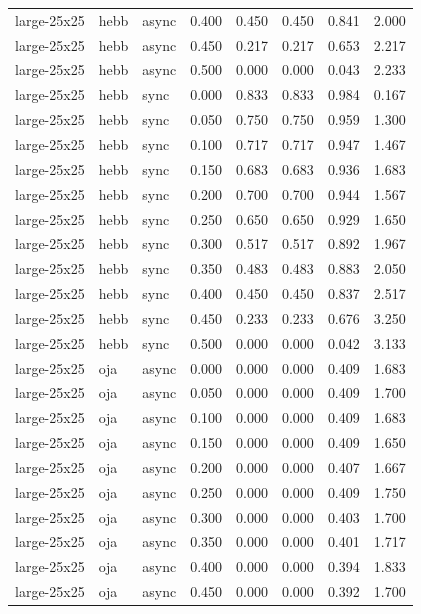 \begin{tabular}{lllrrrrr}
large-25x25 & hebb & async & 0.400 & 0.450 & 0.450 & 0.841 & 2.000 \\
large-25x25 & hebb & async & 0.450 & 0.217 & 0.217 & 0.653 & 2.217 \\
large-25x25 & hebb & async & 0.500 & 0.000 & 0.000 & 0.043 & 2.233 \\
large-25x25 & hebb & sync & 0.000 & 0.833 & 0.833 & 0.984 & 0.167 \\
large-25x25 & hebb & sync & 0.050 & 0.750 & 0.750 & 0.959 & 1.300 \\
large-25x25 & hebb & sync & 0.100 & 0.717 & 0.717 & 0.947 & 1.467 \\
large-25x25 & hebb & sync & 0.150 & 0.683 & 0.683 & 0.936 & 1.683 \\
large-25x25 & hebb & sync & 0.200 & 0.700 & 0.700 & 0.944 & 1.567 \\
large-25x25 & hebb & sync & 0.250 & 0.650 & 0.650 & 0.929 & 1.650 \\
large-25x25 & hebb & sync & 0.300 & 0.517 & 0.517 & 0.892 & 1.967 \\
large-25x25 & hebb & sync & 0.350 & 0.483 & 0.483 & 0.883 & 2.050 \\
large-25x25 & hebb & sync & 0.400 & 0.450 & 0.450 & 0.837 & 2.517 \\
large-25x25 & hebb & sync & 0.450 & 0.233 & 0.233 & 0.676 & 3.250 \\
large-25x25 & hebb & sync & 0.500 & 0.000 & 0.000 & 0.042 & 3.133 \\
large-25x25 & oja & async & 0.000 & 0.000 & 0.000 & 0.409 & 1.683 \\
large-25x25 & oja & async & 0.050 & 0.000 & 0.000 & 0.409 & 1.700 \\
large-25x25 & oja & async & 0.100 & 0.000 & 0.000 & 0.409 & 1.683 \\
large-25x25 & oja & async & 0.150 & 0.000 & 0.000 & 0.409 & 1.650 \\
large-25x25 & oja & async & 0.200 & 0.000 & 0.000 & 0.407 & 1.667 \\
large-25x25 & oja & async & 0.250 & 0.000 & 0.000 & 0.409 & 1.750 \\
large-25x25 & oja & async & 0.300 & 0.000 & 0.000 & 0.403 & 1.700 \\
large-25x25 & oja & async & 0.350 & 0.000 & 0.000 & 0.401 & 1.717 \\
large-25x25 & oja & async & 0.400 & 0.000 & 0.000 & 0.394 & 1.833 \\
large-25x25 & oja & async & 0.450 & 0.000 & 0.000 & 0.392 & 1.700 \\

\end{tabular}

